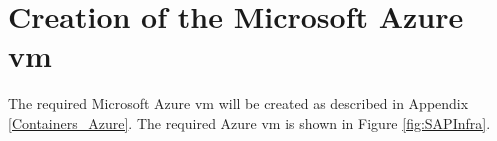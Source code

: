 \label{SAPConfig}
\section{Creation of the Microsoft Azure \acrshort{vm}}
The required Microsoft Azure \acrshort{vm} will be created as described in Appendix \ref{Containers_Azure}. 
The required Azure \acrshort{vm} is shown in Figure \ref{fig:SAPInfra}.

